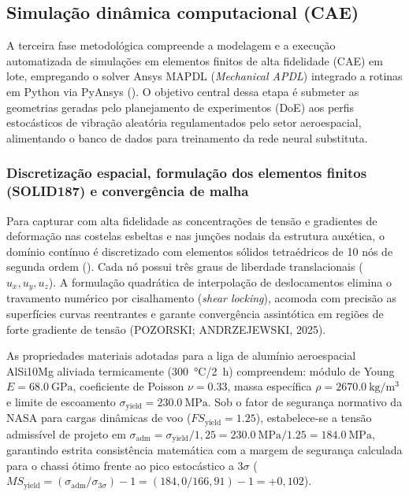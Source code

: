 \subsection{Simulação dinâmica computacional (CAE)}
\label{subsec:cae}

A terceira fase metodológica compreende a modelagem e a execução automatizada de simulações em elementos finitos de alta fidelidade (CAE) em lote, empregando o solver Ansys MAPDL (\textit{Mechanical APDL}) integrado a rotinas em Python via PyAnsys (). O objetivo central dessa etapa é submeter as geometrias geradas pelo planejamento de experimentos (DoE) aos perfis estocásticos de vibração aleatória regulamentados pelo setor aeroespacial, alimentando o banco de dados para treinamento da rede neural substituta.

\subsubsection{Discretização espacial, formulação dos elementos finitos (SOLID187) e convergência de malha}
\label{subsubsec:solid187}

Para capturar com alta fidelidade as concentrações de tensão e gradientes de deformação nas costelas esbeltas e nas junções nodais da estrutura auxética, o domínio contínuo é discretizado com elementos sólidos tetraédricos de 10 nós de segunda ordem (). Cada nó possui três graus de liberdade translacionais ($u_x, u_y, u_z$). A formulação quadrática de interpolação de deslocamentos elimina o travamento numérico por cisalhamento (\textit{shear locking}), acomoda com precisão as superfícies curvas reentrantes e garante convergência assintótica em regiões de forte gradiente de tensão (POZORSKI; ANDRZEJEWSKI, 2025).

As propriedades materiais adotadas para a liga de alumínio aeroespacial AlSi10Mg aliviada termicamente (\SI{300}{\celsius}/\SI{2}{\hour}) compreendem: módulo de Young $E = \SI{68.0}{\giga\pascal}$, coeficiente de Poisson $\nu = \num{0.33}$, massa específica $\rho = \SI{2670.0}{\kilo\gram\per\cubic\metre}$ e limite de escoamento $\sigma_{\text{yield}} = \SI{230.0}{\mega\pascal}$. Sob o fator de segurança normativo da NASA para cargas dinâmicas de voo ($FS_{\text{yield}} = \num{1.25}$), estabelece-se a tensão admissível de projeto em $\sigma_{\text{adm}} = \sigma_{\text{yield}} / 1{,}25 = \SI{230.0}{\mega\pascal} / \num{1.25} = \SI{184.0}{\mega\pascal}$, garantindo estrita consistência matemática com a margem de segurança calculada para o chassi ótimo frente ao pico estocástico a $3\sigma$ ($MS_{\text{yield}} = (\sigma_{\text{adm}} / \sigma_{3\sigma}) - 1 = (184{,}0 / 166{,}91) - 1 = +0{,}102$).

